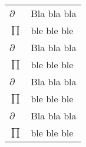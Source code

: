 \begin{thesissymbols}
\begin{footnotesize}
\begin{longtable}[l]{p{2cm}l}
  $\partial$   \dotfill  & Bla bla bla \\
  $\prod$       \dotfill & ble ble ble \\
  $\partial$   \dotfill  & Bla bla bla \\
  $\prod$       \dotfill & ble ble ble \\
  $\partial$   \dotfill  & Bla bla bla \\
  $\prod$       \dotfill & ble ble ble \\
  $\partial$   \dotfill  & Bla bla bla \\
  $\prod$       \dotfill & ble ble ble \\          
\end{longtable}
\end{footnotesize}
\end{thesissymbols}
